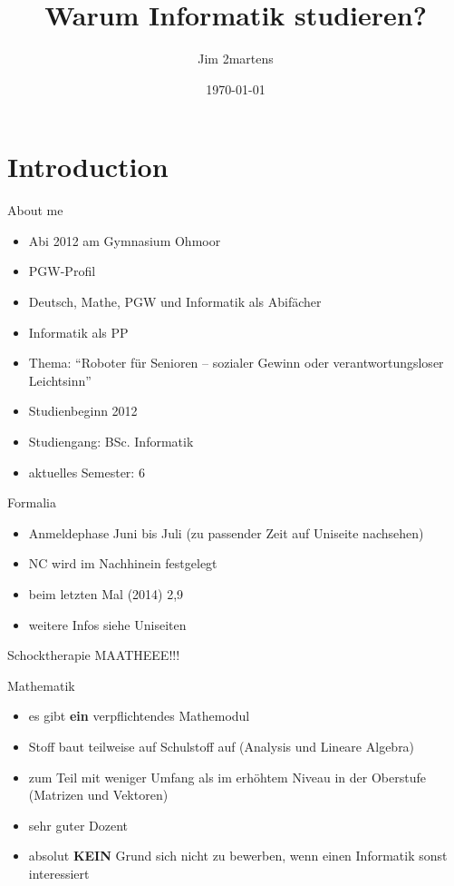 \documentclass{beamer}
\begin{document}
\author{Jim 2martens}
\title{Warum Informatik studieren?}
\date{\today}

\begin{frame}
    \titlepage\end{frame}

\begin{frame}
    \tableofcontents
\end{frame}

\section{Introduction}
\begin{frame}{About me}
    \begin{itemize}
      \item Abi 2012 am Gymnasium Ohmoor
      \item PGW-Profil
      \item Deutsch, Mathe, PGW und Informatik als Abifächer
      \item Informatik als PP
      \item Thema: "`Roboter für Senioren – sozialer Gewinn oder
verantwortungsloser Leichtsinn"'
      \item Studienbeginn 2012
      \item Studiengang: BSc. Informatik
      \item aktuelles Semester: 6
    \end{itemize}
\end{frame}

\begin{frame}{Formalia}
  \begin{itemize}
    \item Anmeldephase Juni bis Juli (zu passender Zeit auf Uniseite nachsehen)
    \item NC wird im Nachhinein festgelegt
    \item beim letzten Mal (2014) 2,9
    \item weitere Infos siehe Uniseiten
  \end{itemize}
\end{frame}

\begin{frame}{Schocktherapie}
  \centering
  MAATHEEE!!!
\end{frame}
\begin{frame}{Mathematik}
  \begin{itemize}
    \item es gibt \textbf{ein} verpflichtendes Mathemodul
    \item Stoff baut teilweise auf Schulstoff auf (Analysis und Lineare Algebra)
    \item zum Teil mit weniger Umfang als im erhöhtem Niveau in der Oberstufe (Matrizen und Vektoren)
    \item sehr guter Dozent
    \item absolut \textbf{KEIN} Grund sich nicht zu bewerben, wenn einen Informatik sonst interessiert
  \end{itemize}
\end{frame}
\end{document}
